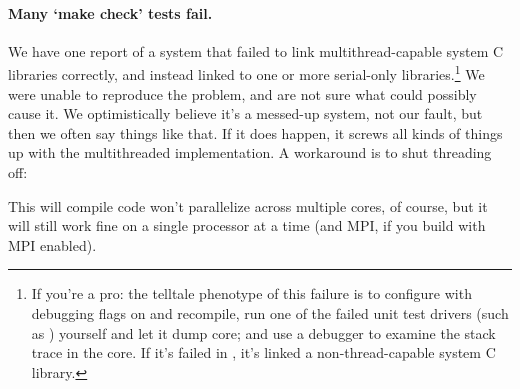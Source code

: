 \paragraph{Many `make check' tests fail.} We have one report of a
system that failed to link multithread-capable system C libraries
correctly, and instead linked to one or more serial-only
libraries.\footnote{If you're a pro: the telltale phenotype of this
  failure is to configure with debugging flags on and recompile, run
  one of the failed unit test drivers (such as
  ) yourself and let it dump core; and use a
  debugger to examine the stack trace in the core. If it's failed in
  , it's linked a non-thread-capable
  system C library.} We were unable to reproduce the problem, and are
not sure what could possibly cause it. We optimistically believe it's
a messed-up system, not our fault, but then we often say things like that. If it does happen, it screws all
kinds of things up with the multithreaded implementation. A workaround
is to shut threading off:


This will compile code won't parallelize across multiple cores, of
course, but it will still work fine on a single processor at a time
(and MPI, if you build with MPI enabled).

